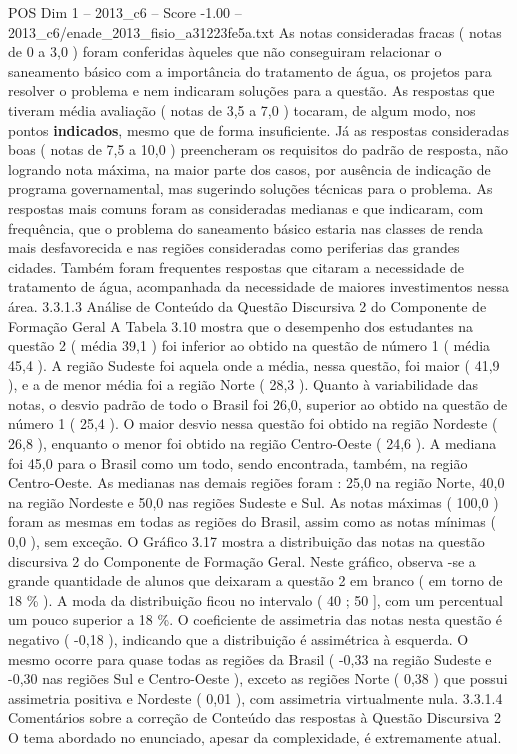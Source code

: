\begin{textsample}{POS Dim 1 – 2013\_c6 – Score -1.00 – 2013\_c6/enade\_2013\_fisio\_a31223fe5a.txt}
As notas consideradas fracas ( notas de 0 a 3,0 ) foram conferidas àqueles que não conseguiram relacionar o saneamento básico com a importância do tratamento de água, os projetos para resolver o problema e nem indicaram soluções para a questão.
As respostas que tiveram média avaliação ( notas de 3,5 a 7,0 ) tocaram, de algum modo, nos pontos \textbf{indicados}, mesmo que de forma insuficiente.
Já as respostas consideradas boas ( notas de 7,5 a 10,0 ) preencheram os requisitos do padrão de resposta, não logrando nota máxima, na maior parte dos casos, por ausência de indicação de programa governamental, mas sugerindo soluções técnicas para o problema.
As respostas mais comuns foram as consideradas medianas e que indicaram, com frequência, que o problema do saneamento básico estaria nas classes de renda mais desfavorecida e nas regiões consideradas como periferias das grandes cidades.
Também foram frequentes respostas que citaram a necessidade de tratamento de água, acompanhada da necessidade de maiores investimentos nessa área. 3.3.1.3 Análise de Conteúdo da Questão Discursiva 2 do Componente de Formação Geral A Tabela 3.10 mostra que o desempenho dos estudantes na questão 2 ( média 39,1 ) foi inferior ao obtido na questão de número 1 ( média 45,4 ).
A região Sudeste foi aquela onde a média, nessa questão, foi maior ( 41,9 ), e a de menor média foi a região Norte ( 28,3 ).
Quanto à variabilidade das notas, o desvio padrão de todo o Brasil foi 26,0, superior ao obtido na questão de número 1 ( 25,4 ).
O maior desvio nessa questão foi obtido na região Nordeste ( 26,8 ), enquanto o menor foi obtido na região Centro-Oeste ( 24,6 ).
A mediana foi 45,0 para o Brasil como um todo, sendo encontrada, também, na região Centro-Oeste.
As medianas nas demais regiões foram : 25,0 na região Norte, 40,0 na região Nordeste e 50,0 nas regiões Sudeste e Sul.
As notas máximas ( 100,0 ) foram as mesmas em todas as regiões do Brasil, assim como as notas mínimas ( 0,0 ), sem exceção.
O Gráfico 3.17 mostra a distribuição das notas na questão discursiva 2 do Componente de Formação Geral.
Neste gráfico, observa -se a grande quantidade de alunos que deixaram a questão 2 em branco ( em torno de 18 \% ).
A moda da distribuição ficou no intervalo ( 40 ; 50 ], com um percentual um pouco superior a 18 \%.
O coeficiente de assimetria das notas nesta questão é negativo ( -0,18 ), indicando que a distribuição é assimétrica à esquerda.
O mesmo ocorre para quase todas as regiões da Brasil ( -0,33 na região Sudeste e -0,30 nas regiões Sul e Centro-Oeste ), exceto as regiões Norte ( 0,38 ) que possui assimetria positiva e Nordeste ( 0,01 ), com assimetria virtualmente nula. 3.3.1.4 Comentários sobre a correção de Conteúdo das respostas à Questão Discursiva 2 O tema abordado no enunciado, apesar da complexidade, é extremamente atual.

\end{textsample}

